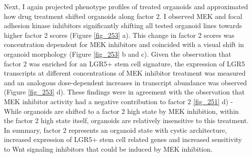 \begin{flushleft}
Next, I again projected phenotype profiles of treated organoids and approximated how drug treatment shifted organoids along factor 2. I observed MEK and focal adhesion kinase inhibitors significantly shifting all tested organoid lines towards higher factor 2 scores (Figure \ref{fig_253} a). This change in factor 2 scores was concentration dependent for MEK inhibitors and coincided with a visual shift in organoid morphology (Figure \ref{fig_253} b and c). Given the observation that factor 2 was enriched for an LGR5+ stem cell signature, the expression of LGR5 transcripts at different concentrations of MEK inhibitor treatment was measured and an analogous dose-dependent increases in transcript abundance was observed (Figure \ref{fig_253} d). These findings were in agreement with the observation that MEK inhibitor activity had a negative contribution to factor 2 \ref{fig_251} d) - While organoids are shifted to a factor 2 high state by MEK inhibition, within the factor 2 high state itself, organoids are relatively insensitive to this treatment. In summary, factor 2 represents an organoid state with cystic architecture, increased expression of LGR5+ stem cell related genes and increased sensitivity to Wnt signaling inhibitors that could be induced by MEK inhibition.

\end{flushleft}

